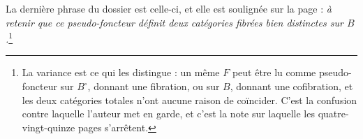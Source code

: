 \documentclass[11pt,a4paper]{article}
\begin{document}
La dernière phrase du dossier est celle-ci, et elle est soulignée sur la page :
\emph{à retenir que ce pseudo-foncteur définit deux catégories fibrées bien
distinctes sur $B$.}\footnote{La variance est ce qui les distingue : un même
$F$ peut être lu comme pseudo-foncteur sur $B^{\circ}$, donnant une fibration,
ou sur $B$, donnant une cofibration, et les deux catégories totales n'ont
aucune raison de coïncider. C'est la confusion contre laquelle l'auteur met en
garde, et c'est la note sur laquelle les quatre-vingt-quinze pages
s'arrêtent.}
\end{document}
